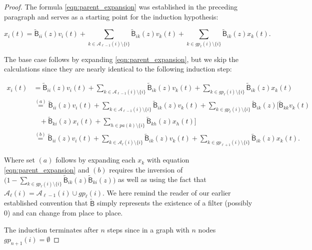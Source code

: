 \documentclass[12pt]{article}
\def\B{\mathsf{B}}  %
\def\wtB{\widetilde{\B}}  %
\newcommand{\pa}[1]{pa(#1)}  %
\newcommand{\ancn}[2]{\mathcal{A}_{#1}(#2)}  %
\newcommand{\gpn}[2]{gp_{#1}(#2)}  # nth generation grandparents
\begin{document}
\begin{proof}
  The formula \ref{eqn:parent_expansion} was established in the
  preceding paragraph and serves as a starting point for the induction
  hypothesis:

  \begin{equation}
    \label{eqn:induction}
    x_i(t) = \wtB_{ii}(z)v_i(t) + \sum_{k \in \ancn{\ell - 1}{i}\setminus \{i\}}\wtB_{ik}(z)v_k(t) + \sum_{k \in \gpn{\ell}{i} \setminus \{i\}}\wtB_{ik}(z)x_k(t).
  \end{equation}

  The base case follows by expanding \ref{eqn:parent_expansion}, but we skip the calculations since they are nearly identical to the following induction step:

  \begin{align*}
    x_i(t) &= \wtB_{ii}(z)v_i(t) + \sum_{k \in \ancn{\ell - 1}{i}\setminus \{i\}}\wtB_{ik}(z)v_k(t) + \sum_{k \in \gpn{\ell}{i} \setminus \{i\}}\wtB_{ik}(z)x_k(t)\\
           &\overset{(a)}{=} \wtB_{ii}(z)v_i(t) + \sum_{k \in \ancn{\ell - 1}{i}\setminus \{i\}}\wtB_{ik}(z)v_k(t) + \sum_{k \in \gpn{\ell}{i} \setminus \{i\}}\wtB_{ik}(z)\big[\wtB_{kk}v_k(t)\\
    &\ \ \ \  + \wtB_{ki}(z)x_i(t) + \sum_{h \in \pa{k}\setminus \{i\}}\wtB_{kh}(z)x_h(t)\big]\\
    &\overset{(b)}{=} \wtB_{ii}(z)v_i(t) + \sum_{k \in \ancn{\ell}{i} \setminus \{i\}}\wtB_{ik}(z)v_k(t) + \sum_{k \in \gpn{\ell + 1}{i} \setminus \{i\}}\wtB_{ik}(z)x_k(t).
  \end{align*}

  Where set $(a)$ follows by expanding each $x_k$ with equation \ref{eqn:parent_expansion} and $(b)$ requires the inversion of $\big(1 - \sum_{k \in \gpn{\ell}{i}\setminus\{i\}}\wtB_{ik}(z)\wtB_{ki}(z)\big)$ as well as using the fact that $\ancn{\ell}{i} = \ancn{\ell - 1}{i}\cup\gpn{\ell}{i}$.  We here remind the reader of our earlier established convention that $\wtB$ simply represents the existence of a filter (possibly 0) and can change from place to place.

The induction terminates after $n$ steps since in a graph with $n$ nodes $\gpn{n + 1}{i} = \emptyset$




\end{proof}
\end{document}
